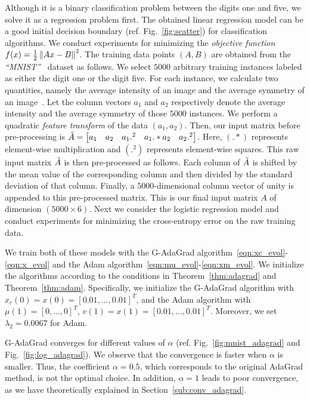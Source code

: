 Although it is a binary classification problem between the digits one and five, we solve it as a regression problem first. The obtained linear regression model can be a good initial decision boundary (ref. Fig.~\ref{fig:scatter}) for classification algorithms.
We conduct experiments for minimizing the {\em objective function} $f(x)=\frac{1}{2}\left\lVert Ax-B\right\rVert ^2$. The training data points $(A,B)$ are obtained from the \textit{``MNIST''}~\cite{MNIST} dataset as follows. We select $5000$ arbitrary training instances labeled as either the digit one or the digit five. For each instance, we calculate two quantities, namely the average intensity of an image and the average symmetry of an image~\cite{abu2012learning}. Let the column vectors $a_1$ and $a_2$ respectively denote the average intensity and the average symmetry of those $5000$ instances. We perform a quadratic {\em feature transform} of the data $(a_1,a_2)$. Then, our input matrix before pre-processing is $\Tilde{A} = \begin{bmatrix} a_1 & a_2 & a_1.^2 & a_1.*a_2 & a_2.^2 \end{bmatrix}$. Here, $(.*)$ represents element-wise multiplication and $(.^2)$ represents element-wise squares. This raw input matrix $\Tilde{A}$ is then pre-processed as follows. Each column of $\Tilde{A}$ is shifted by the mean value of the corresponding column and then divided by the standard deviation of that column. Finally, a $5000$-dimensional column vector of unity is appended to this pre-processed matrix. This is our final input matrix $A$ of dimension $(5000 \times 6)$. Next we consider the logistic regression model and conduct experiments for minimizing the cross-entropy error on the raw training data.

We train both of these models with the G-AdaGrad algorithm~\eqref{eqn:xc_evol}-\eqref{eqn:x_evol} and the Adam algorithm~\eqref{eqn:mu_evol}-\eqref{eqn:xm_evol}. We initialize the algorithms according to the conditions in Theorem~\ref{thm:adagrad} and Theorem~\ref{thm:adam}. Specifically, we initialize the G-AdaGrad algorithm with $x_c(0) = x(0) = [0.01,\ldots,0.01]^T$, and the Adam algorithm with $\mu(1) = [0,\ldots,0]^T$, $v(1) = x(1) = [0.01,\ldots,0.01]^T$. Moreover, we set $\lambda_2 = 0.0067$ for Adam.

G-AdaGrad converges for different values of $\alpha$ (ref. Fig.~\ref{fig:mnist_adagrad} and Fig.~\ref{fig:log_adagrad}). We observe that the convergence is faster when $\alpha$ is smaller. Thus, the coefficient $\alpha = 0.5$, which corresponds to the original AdaGrad method, is not the optimal choice. In addition, $\alpha=1$ leads to poor convergence, as we have theoretically explained in Section~\ref{sub:conv_adagrad}.

